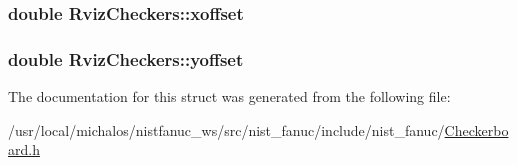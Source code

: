 \hypertarget{structRvizCheckers_af8fd72f18a7e6fd184015fd8fd338a52}{
\subsubsection[{xoffset}]{\setlength{\rightskip}{0pt plus 5cm}double Rviz\-Checkers\-::xoffset}}\label{structRvizCheckers_af8fd72f18a7e6fd184015fd8fd338a52}
\hypertarget{structRvizCheckers_aeb28b7e85a132ec8fcd58feb4e8f7268}{
\subsubsection[{yoffset}]{\setlength{\rightskip}{0pt plus 5cm}double Rviz\-Checkers\-::yoffset}}\label{structRvizCheckers_aeb28b7e85a132ec8fcd58feb4e8f7268}


The documentation for this struct was generated from the following file\-:\begin{DoxyCompactItemize}
\item 
/usr/local/michalos/nistfanuc\-\_\-ws/src/nist\-\_\-fanuc/include/nist\-\_\-fanuc/\hyperlink{Checkerboard_8h}{Checkerboard.\-h}\end{DoxyCompactItemize}
